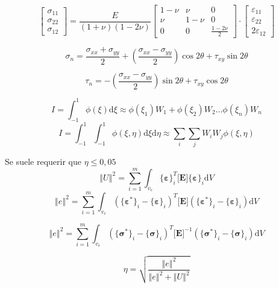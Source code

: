 \documentclass[11pt, a4paper,titlepage]{article}
\newcommand{\vvert}[1]{\left\Vert #1\right\Vert}
\newcommand{\di}{\textrm{d}}
\newcommand{\sigmab}{\boldsymbol{\sigma}}
\newcommand{\varepsilonb}{\boldsymbol{\varepsilon}}
\newcommand{\Mme}[1]{\boldsymbol{[}\mathbf{#1} \boldsymbol{]}}
\newcommand{\Cme}[1]{\boldsymbol{\{ }\mathbf{#1} \boldsymbol{\}} }
\newcommand{\ME}{\Mme{E}}
\begin{document}
\begin{equation}
\begin{bmatrix}
\sigma_{11} \\
\sigma_{22} \\
\sigma_{12}
\end{bmatrix}
={\frac{E}{(1+\nu)(1-2\nu)}} 
\begin{bmatrix}
1-\nu & \nu &0 \\
\nu &1-\nu& 0 \\
0 & 0 & \frac{1-2\nu}{2}
\end{bmatrix}
\cdot
\begin{bmatrix}
\varepsilon_{11} \\
\varepsilon_{22} \\
2\varepsilon_{12}
\end{bmatrix}
\end{equation}

\begin{equation}
\sigma_{n}=\frac{\sigma_{xx}+\sigma_{yy}}{2}+\left(\frac{\sigma_{xx}-\sigma_{yy}}{2}\right)\cos 2\theta +\tau_{xy}\sin 2\theta 
\end{equation}

\begin{equation}
\tau_{n}=-\left(\frac{\sigma_{xx}-\sigma_{yy}}{2}\right)\sin 2\theta +\tau_{xy}\cos 2\theta 
\end{equation}

\begin{equation}
I=\int^1_{-1} \phi(\xi) \di \xi \approx \phi(\xi_1) W_1+\phi(\xi_2) W_2 \ldots \phi(\xi_n) W_n
\end{equation}
\begin{equation}
I=\int^1_{-1} \int^1_{-1}\phi(\xi,\eta) \di \xi \di \eta\approx \sum_i \sum_j W_i W_j\phi(\xi,\eta) 
\end{equation}

Se suele requerir que $\eta\leq 0,05$
\[
\vvert{U}^2 = \sum^m_{i=1}\int_{v_e} \Cme{\varepsilonb}_i^T \ME \Cme{\varepsilonb}_i \di V
\]
\[
\vvert{e}^2=\sum_{i=1}^m \int_{v_e} \left( \Cme{\varepsilonb^*}_i - \Cme{\varepsilonb}_i\right)^T \ME \left( \Cme{\varepsilonb^*}_i - \Cme{\varepsilonb}_i\right) \di V
\]

\[
\vvert{e}^2=\sum_{i=1}^m \int_{v_e} \left( \Cme{\sigmab^*}_i - \Cme{\sigmab}_i\right)^T \ME ^{-1} \left( \Cme{\sigmab^*}_i - \Cme{\sigmab}_i\right) \di V
\]

\[
\eta = \sqrt{\frac{\vvert{e}^2}{\vvert{e}^2+\vvert{U}^2}}
\]
\clearpage
\end{document}
